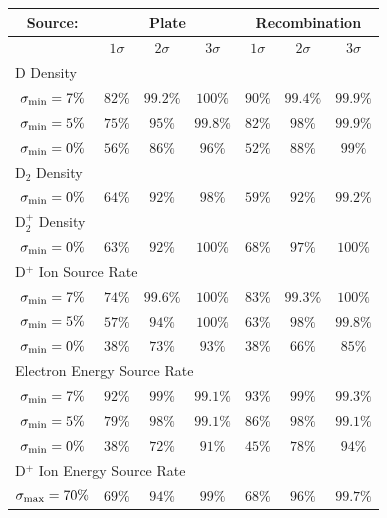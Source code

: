 \documentclass[12pt]{report}
\begin{document}
\begin{tabular}{|c||c|c|c||c|c|c|}
\hline
 Source:       & \multicolumn{3}{|c||}{Plate} & \multicolumn{3}{|c|}{Recombination} \\ \hline  %
        & $1 \sigma$ & $2 \sigma$ & $3 \sigma$ & $1 \sigma$ & $2 \sigma$ & $3 \sigma$ \\ \hline
\multicolumn{7}{|l|}{D Density} \\ \hline
$\sigma_{\rm min}=7 \%$ & $82 \%$ & $99.2 \%$ & $100  \%$ & $90 \%$ & $99.4 \%$ & $99.9 \%$ \\ \hline
$\sigma_{\rm min}=5 \%$ & $75 \%$ & $95   \%$ & $99.8 \%$ & $82 \%$ & $98   \%$ & $99.9 \%$ \\ \hline
$\sigma_{\rm min}=0 \%$ & $56 \%$ & $86   \%$ & $96   \%$ & $52 \%$ & $88   \%$ & $99   \%$ \\ \hline
\multicolumn{7}{|l|}{D$_{2}$ Density} \\ \hline
$\sigma_{\rm min}=0 \%$ & $64 \%$ & $92 \%$ & $98   \%$ & $59 \%$ & $92 \%$ & $99.2 \%$ \\ \hline
\multicolumn{7}{|l|}{D$_{2}^{+}$ Density} \\ \hline
$\sigma_{\rm min}=0 \%$ & $63 \%$ & $92 \%$ & $100  \%$ & $68 \%$ & $97  \%$ & $100  \%$ \\ \hline
\multicolumn{7}{|l|}{D$^{+}$ Ion Source Rate} \\ \hline
$\sigma_{\rm min}=7 \%$ & $74 \%$ & $99.6 \%$ & $100  \%$ & $83 \%$ & $99.3 \%$ & $100  \%$ \\ \hline
$\sigma_{\rm min}=5 \%$ & $57 \%$ & $94   \%$ & $100  \%$ & $63 \%$ & $98   \%$ & $99.8 \%$ \\ \hline
$\sigma_{\rm min}=0 \%$ & $38 \%$ & $73   \%$ & $93   \%$ & $38 \%$ & $66   \%$ & $85   \%$ \\ \hline
\multicolumn{7}{|l|}{Electron Energy Source Rate} \\ \hline
$\sigma_{\rm min}=7 \%$ & $92 \%$ & $99 \%$ & $99.1 \%$ & $93 \%$ & $99 \%$ & $99.3 \%$ \\ \hline
$\sigma_{\rm min}=5 \%$ & $79 \%$ & $98 \%$ & $99.1 \%$ & $86 \%$ & $98 \%$ & $99.1 \%$ \\ \hline
$\sigma_{\rm min}=0 \%$ & $38 \%$ & $72 \%$ & $91   \%$ & $45 \%$ & $78 \%$ & $94   \%$ \\ \hline
\multicolumn{7}{|l|}{D$^{+}$ Ion Energy Source Rate} \\ \hline
$\sigma_{\rm max}=70 \%$ & $69 \%$ & $94 \%$ & $99   \%$ & $68 \%$ & $96 \%$ & $99.7 \%$ \\ \hline

\end{tabular}
\end{document}
